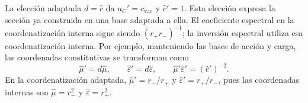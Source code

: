 La elección adaptada $d=\widehat c$ da $u_C'=c_{\mathrm{vac}}$ y
$\widehat c'=1$. Esta elección expresa la sección ya construida en una
base adaptada a ella. El coeficiente espectral en la coordenatización interna sigue
siendo $(r_+r_-)^{-1}$; la inversión espectral utiliza esa coordenatización interna.
Por ejemplo, manteniendo las bases de acción y carga, las coordenadas
constitutivas se transforman como
\[
 \widehat\mu'=d\widehat\mu,
 \qquad \widehat\varepsilon'=d\widehat\varepsilon,
 \qquad
 \widehat\mu'\widehat\varepsilon'=(\widehat c')^{-2}.
\]
En la coordenatización adaptada, $\widehat\mu'=r_-/r_+$ y
$\widehat\varepsilon'=r_+/r_-$, pues las coordenadas internas son
$\widehat\mu=r_-^2$ y $\widehat\varepsilon=r_+^2$.
